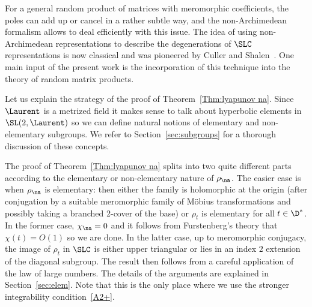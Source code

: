 For a general random product of matrices with meromorphic coefficients, the poles can add up or cancel in a rather subtle way, and the non-Archimedean formalism allows to deal efficiently with this issue. The idea of using non-Archimedean representations to describe the degenerations of $\SLC$ representations is now classical and was pioneered by Culler and Shalen~\cite{culler-shalen}. One main input of the present work is the incorporation of this technique into the theory of random matrix products.

Let us explain the strategy of the proof of Theorem~\ref{Thm:lyapunov na}. Since $\Laurent$ is a metrized field it makes sense to talk about hyperbolic elements in $\SL(2,\Laurent)$ so we can define natural notions of elementary and non-elementary subgroups. We refer to Section~\ref{sec:subgroups} for a thorough discussion of these concepts.

The proof of Theorem~\ref{Thm:lyapunov na} splits into two quite different parts according to the elementary or non-elementary nature of $\rho_\na$. The easier case is when $\rho_\na$ is elementary: then either the family is holomorphic at the origin (after conjugation by a suitable meromorphic family of M\"obius transformations and possibly taking a branched 2-cover of the base) or $\rho_t$ is elementary for all $t\in \D^*$. In the former case, $\chi_\na = 0$ and it follows from Furstenberg's theory that $\chi(t) = O(1)$ so we are done. In the latter case, up to meromorphic conjugacy, the image of $\rho_t$ in $\SLC$ is either upper triangular or lies in an index $2$ extension of the diagonal subgroup. The result then follows from a careful application of the law of large numbers. The details of the arguments are explained in Section~\ref{sec:elem}. Note that this is the only place where we use the stronger integrability condition~\eqref{A2+}.


